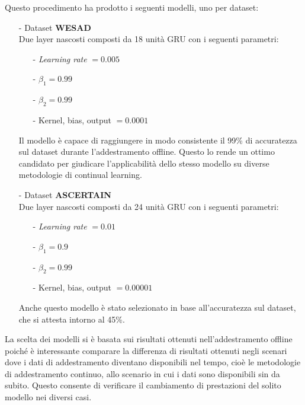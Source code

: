\pagebreak
Questo procedimento ha prodotto i seguenti modelli, uno per dataset:
\begin{itemize}
    \item[-] Dataset \textbf{WESAD}\\
    Due layer nascosti composti da 18 unità GRU con i seguenti parametri:
    \begin{itemize}
        \item[-] \textit{Learning rate} $= 0.005$
        \item[-] $\beta_1 = 0.99$
        \item[-] $\beta_2 = 0.99$
        \item[-] Kernel, bias, output $= 0.0001$
    \end{itemize}
    Il modello è capace di raggiungere in modo consistente il 99\% di accuratezza sul dataset durante l'addestramento offline. Questo lo rende un ottimo candidato per giudicare l'applicabilità dello stesso modello su diverse metodologie di continual learning.
    \item[-] Dataset \textbf{ASCERTAIN}\\
    Due layer nascosti composti da 24 unità GRU con i seguenti parametri:
    \begin{itemize}
        \item[-] \textit{Learning rate} $= 0.01$
        \item[-] $\beta_1 = 0.9$
        \item[-] $\beta_2 = 0.99$
        \item[-] Kernel, bias, output $= 0.00001$
    \end{itemize}
    Anche questo modello è stato selezionato in base all'accuratezza sul dataset, che si attesta intorno al 45\%.
\end{itemize}
La scelta dei modelli si è basata sui risultati ottenuti nell'addestramento offline poiché è interessante comparare la differenza di risultati ottenuti negli scenari dove i dati di addestramento diventano disponibili nel tempo, cioè le metodologie di addestramento continuo, allo scenario in cui i dati sono disponibili sin da subito. Questo consente di verificare il cambiamento di prestazioni del solito modello nei diversi casi.
